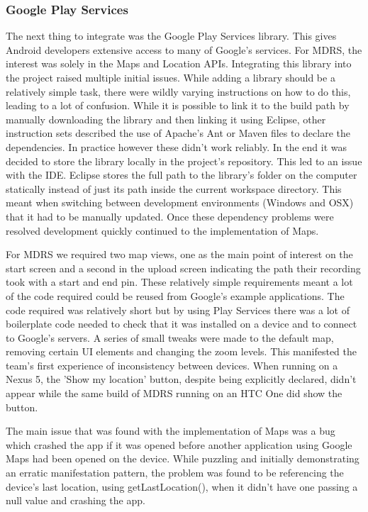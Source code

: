 \documentclass{l3proj}
\begin{document}
\subsubsection{Google Play Services}    The next thing to integrate was the Google Play Services library. This gives Android developers extensive access to many of Google's services. For MDRS, the interest was solely in the Maps and Location APIs. Integrating this library into the project raised multiple initial issues. While adding a library should be a relatively simple task, there were wildly varying instructions on how to do this, leading to a lot of confusion. While it is possible to link it to the build path by manually downloading the library and then linking it using Eclipse, other instruction sets described the use of Apache's Ant or Maven files to declare the dependencies. In practice however these didn't work reliably. In the end it was decided to store the library locally in the project's repository. This led to an issue with the IDE. Eclipse stores the full path to the library's folder on the computer statically instead of just its path inside the current workspace directory. This meant when switching between development environments (Windows and OSX) that it had to be manually updated. Once these dependency problems were resolved development quickly continued to the implementation of Maps.

For MDRS we required two map views, one as the main point of interest on the start screen and a second in the upload screen indicating the path their recording took with a start and end pin. These relatively simple requirements meant a lot of the code required could be reused from Google's example applications. The code required was relatively short but by using Play Services there was a lot of boilerplate code needed to check that it was installed on a device and to connect to Google's servers. A series of small tweaks were made to the default map, removing certain UI elements and changing the zoom levels. This manifested the team's first experience of inconsistency between devices. When running on a Nexus 5, the 'Show my location' button, despite being explicitly declared, didn't appear while the same build of MDRS running on an HTC One did show the button.

The main issue that was found with the implementation of Maps was a bug which crashed the app if it was opened before another application using Google Maps had been opened on the device. While puzzling and initially demonstrating an erratic manifestation pattern, the problem was found to be referencing the device's last location, using getLastLocation(), when it didn't have one passing a null value and crashing the app.
\end{document}
